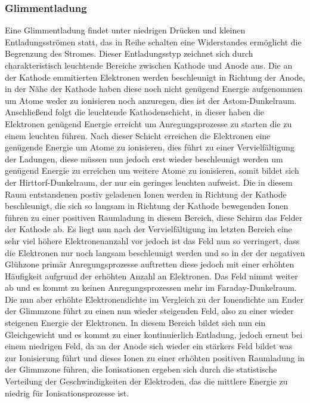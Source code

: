 \subsubsection{Glimmentladung}
Eine Glimmentladung findet unter niedrigen Drücken und kleinen Entladungsströmen statt, das in Reihe schalten eine Widerstandes ermöglicht die Begrenzung des Stromes.
Dieser Entladungsstyp zeichnet sich durch charakteristisch leuchtende Bereiche zwischen Kathode und Anode aus. Die an der Kathode emmitierten Elektronen werden beschleunigt in Richtung der Anode, in der Nähe der Kathode haben diese noch nicht genügend Energie aufgenommen um Atome weder zu ionisieren noch anzuregen, dies ist der Astom-Dunkelraum. Anschließend folgt die leuchtende Kathodenschicht, in dieser haben die Elektronen genügend Energie erreicht um Anregungsprozesse zu starten die zu einem leuchten führen. Nach dieser Schicht erreichen die Elektronen eine genügende Energie um Atome zu ionisieren, dies führt zu einer Vervielfältigung der Ladungen, diese müssen nun jedoch erst wieder beschleunigt werden um genügend Energie zu erreichen um weitere Atome zu ionisieren, somit bildet sich der Hirttorf-Dunkelraum, der nur ein geringes leuchten aufweist. Die in diesem Raum entstandenen postiv geladenen Ionen werden in Richtung der Kathode beschleunigt, die sich so langsam in Richtung der Kathode bewegenden Ionen führen zu einer positiven Raumladung in diesem Bereich, diese Schirm das Felder der Kathode ab. Es liegt nun nach der Vervielfältigung im letzten Bereich eine sehr viel höhere Elektronenanzahl vor jedoch ist das Feld nun so verringert, dass die Elektronen nur noch langsam beschleunigt werden und so in der der negativen Glühzone primär Anregungsprozesse auftretten diese jedoch mit einer erhöhten Häufigkeit aufgrund der erhöhten Anzahl an Elektronen. Das Feld nimmt weiter ab und es kommt zu keinen Anregungsprozessen mehr im Faraday-Dunkelraum. Die nun aber erhöhte Elektronendichte im Vergleich zu der Ionendichte am Ender der Glimmzone führt zu einen nun wieder steigenden Feld, also zu einer wieder steigenen Energie der Elektronen. In diesem Bereich bildet sich nun ein Gleichgewicht und es kommt zu einer kontinuierlich Entladung, jedoch erneut bei einem niedrigen Feld, da an der Anode sich wieder ein stärkers Feld bildet was zur Ionisierung führt und dieses Ionen zu einer erhöhten positiven Raumladung in der Glimmzone führen, die Ionisationen ergeben sich durch die statistische Verteilung der Geschwindigkeiten der Elektroden, das die mittlere Energie zu niedrig für Ionisationsprozesse ist. \cite{stroth2018}

